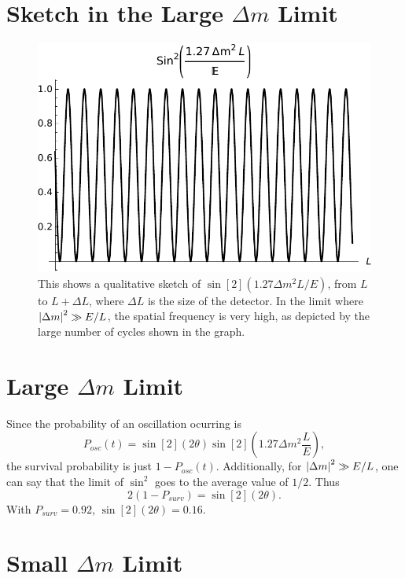 \documentclass[
a4paper,
10pt,
twoside,
]{article}
\begin{document}
\titleinf
\maketitle
\startmcols

\section{Sketch in the Large $\Delta m$ Limit}
\begin{figure}[H]
	\centering
	\includegraphics[width=0.75\linewidth]{figures/1.pdf}
	\captionsetup{width=.65\linewidth}
	\caption{%
	This shows a qualitative sketch of $\sin[2](1.27 \Delta m^2 L/E)$, from $L$ to $L+\Delta L$, where $\Delta L$ is the size of the detector.
	In the limit where $\abs{\Delta m}^2 \gg E/L$, the spatial frequency is very high, as depicted by the large number of cycles shown in the graph.
	}
\end{figure}

\section{Large $\Delta m$ Limit}

Since the probability of an oscillation ocurring is
\begin{equation}
	P_{osc}(t) = \sin[2](2\theta) \sin[2](1.27 \Delta m^2\frac{L}{E}),
\end{equation}
the survival probability is just $1-P_{osc}(t)$.
Additionally, for $\abs{\Delta m}^2 \gg E/L$, one can say that the limit of $\sin^2$ goes to the average value of $1/2$.
Thus
\begin{equation}
	2(1-P_{surv}) = \sin[2](2\theta).
\end{equation}
With $P_{surv} = 0.92$, $\sin[2](2\theta) = 0.16$.

\section{Small $\Delta m$ Limit}
\end{document}
